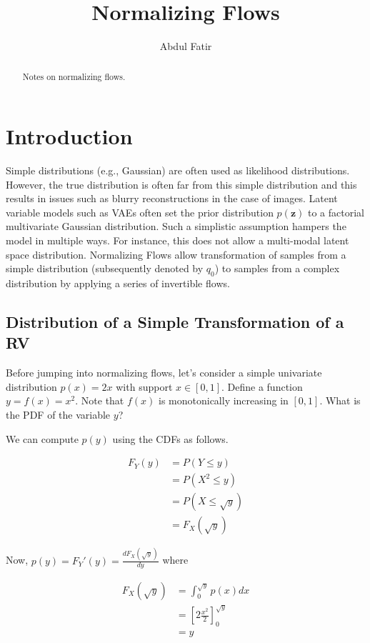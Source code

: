 \documentclass[]{article}
\title{Normalizing Flows}
\author{Abdul Fatir}
\date{}
\begin{document}
\maketitle

\begin{abstract}
Notes on normalizing flows.
\end{abstract}

\section{Introduction}
Simple distributions (e.g., Gaussian) are often used as likelihood distributions. However, the true distribution is often far from this simple distribution and this results in issues such as blurry reconstructions in the case of images. Latent variable models such as VAEs often set the prior distribution $p(\mathbf{z})$ to a factorial multivariate Gaussian distribution. Such a simplistic assumption hampers the model in multiple ways. For instance, this does not allow a multi-modal latent space distribution. Normalizing Flows allow transformation of samples from a simple distribution (subsequently denoted by $q_0$) to samples from a complex distribution by applying a series of invertible flows.

\subsection{Distribution of a Simple Transformation of a RV}

Before jumping into normalizing flows, let's consider a simple univariate distribution $p(x)=2x$ with support $x\in[0,1]$. Define a function $y = f(x) = x^2$. Note that $f(x)$ is monotonically increasing in $[0,1]$. What is the PDF of the variable $y$?

We can compute $p(y)$ using the CDFs as follows.

\begin{align}
F_{Y}(y) &= P(Y \leq y)\\
&= P(X^2 \leq y)\\
&= P(X \leq \sqrt{y})\\
&= F_{X}(\sqrt{y})
\end{align}

Now, $p(y) = F_{Y}'(y) = \frac{dF_{X}(\sqrt{y})}{dy}$ where

\begin{align}
F_{X}(\sqrt{y}) &= \int_{0}^{\sqrt{y}} p(x) dx\\
&=\left[2\frac{x^2}{2}\right]_{0}^{\sqrt{y}}\\
&=y
\end{align}
\end{document}
